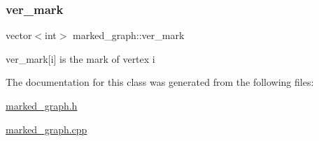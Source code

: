 \subsubsection{\texorpdfstring{ver\+\_\+mark}{ver\_mark}}
{\footnotesize\ttfamily vector$<$int$>$ marked\+\_\+graph\+::ver\+\_\+mark}



ver\+\_\+mark\mbox{[}i\mbox{]} is the mark of vertex i 



The documentation for this class was generated from the following files\+:\begin{DoxyCompactItemize}
\item 
\hyperlink{marked__graph_8h}{marked\+\_\+graph.\+h}\item 
\hyperlink{marked__graph_8cpp}{marked\+\_\+graph.\+cpp}\end{DoxyCompactItemize}
